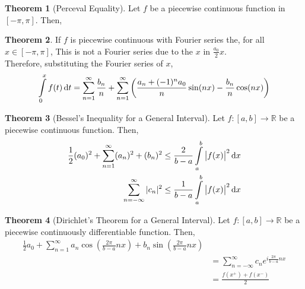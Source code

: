 \documentclass[fleqn, 8pt]{amsart}
\theoremstyle{definition}
\theoremstyle{theorem}
\newtheorem{theorem}{Theorem}
\begin{document}
\begin{multicols}{2}
\begin{spacing}{0.7}
\begin{theorem}[Perceval Equality]
	Let $f$ be a piecewise continuous function in $[-\pi,\pi]$.
	Then,
	\label{Perceval_Equality}
\end{theorem}

\begin{theorem}
	If $f$ is piecewise continuous with Fourier series
	the, for all $x \in [-\pi,\pi]$,
	This is not a Fourier series due to the $x$ in $\frac{a_0}{2} x$.\\
	Therefore, substituting the Fourier series of $x$,
	\begin{equation*}
		\int\limits_{0}^{x} f(t) \dif t = \sum\limits_{n = 1}^{\infty} \frac{b_n}{n} + \sum\limits_{n = 1}^{\infty} \left( \frac{a_n + (-1)^n a_0}{n} \sin(n x) - \frac{b_n}{n} \cos(n x) \right)
	\end{equation*}
\end{theorem}

\begin{theorem}[Bessel's Inequality for a General Interval]
	Let $f : [a,b] \to \mathbb{R}$ be a piecewise continuous function.
	Then,
	\begin{align*}
		\frac{1}{2} (a_0)^2 + \sum\limits_{n = 1}^{\infty} (a_n)^2 + (b_n)^2 &\le \frac{2}{b - a} \int\limits_{a}^{b} \left| f(x) \right|^2 \dif x\\
		\sum\limits_{n = -\infty}^{\infty} |c_n|^2 &\le \frac{1}{b - a} \int\limits_{a}^{b} \left| f(x) \right|^2 \dif x
	\end{align*}
	\label{thm:Bessel's_Inequality_for_a_General_Interval}
\end{theorem}

\begin{theorem}[Dirichlet's Theorem for a General Interval]
	Let $f : [a,b] \to \mathbb{R}$ be a piecewise continuously differentiable function.
	Then,
	\begin{align*}
		\frac{1}{2} a_0 + \sum\limits_{n = 1}^{\infty} a_n \cos\left( \frac{2 \pi}{b - a} n x \right) + b_n \sin\left( \frac{2 \pi}{b - a} n x \right)\\
		&= \sum\limits_{n = -\infty}^{\infty} c_n e^{i \frac{2 \pi}{b - a} n x}\\
		&= \frac{f\left( x^+ \right) + f\left( x^- \right)}{2}
	\end{align*}
	\label{thm:Dirichlet's_Theorem_for_a_General_Interval}
\end{theorem}


\end{spacing}
\end{multicols}
\end{document}
